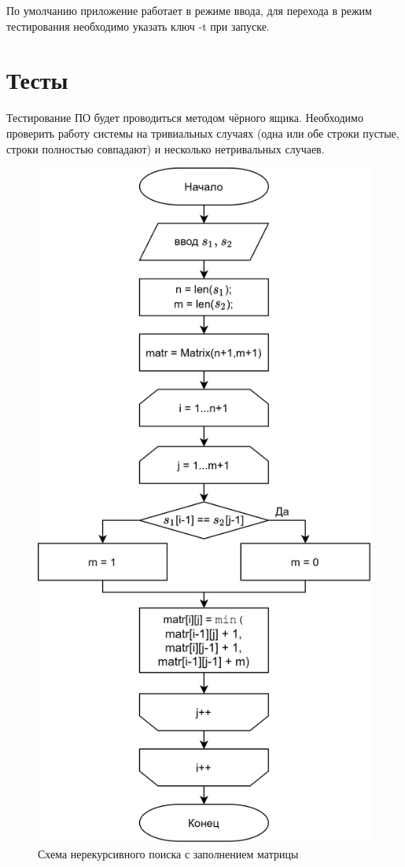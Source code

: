         По умолчанию приложение работает в режиме ввода, для перехода в режим тестирования необходимо указать
        ключ -t при запуске. 

    \section{Тесты}
    Тестирование ПО будет проводиться методом чёрного ящика. Необходимо проверить работу системы 
    на тривиальных случаях (одна или обе строки пустые, строки полностью совпадают) 
    и несколько нетривальных случаев.

    \begin{figure}[h!]
        \centering
        \includegraphics[scale=0.18]{img/LevMatr}
        \caption{Схема нерекурсивного поиска с заполнением матрицы}
        \label{schema:matr:Levenstein}
    \end{figure}

